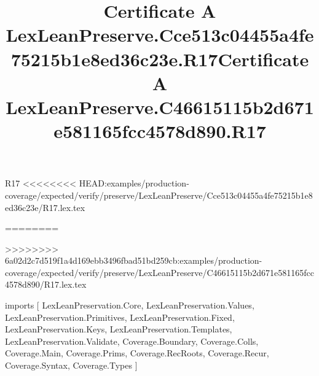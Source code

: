 \begin{lexlean}{R17}
<<<<<<<< HEAD:examples/production-coverage/expected/verify/preserve/LexLeanPreserve/Cce513c04455a4fe75215b1e8ed36c23e/R17.lex.tex
\title{Certificate A LexLeanPreserve.Cce513c04455a4fe75215b1e8ed36c23e.R17}
========
\title{Certificate A LexLeanPreserve.C46615115b2d671e581165fcc4578d890.R17}
>>>>>>>> 6a02d2c7d519f1a4d169ebb3496fbad51bd259cb:examples/production-coverage/expected/verify/preserve/LexLeanPreserve/C46615115b2d671e581165fcc4578d890/R17.lex.tex
\begin{coremodule}
imports [
  LexLeanPreservation.Core,
  LexLeanPreservation.Values,
  LexLeanPreservation.Primitives,
  LexLeanPreservation.Fixed,
  LexLeanPreservation.Keys,
  LexLeanPreservation.Templates,
  LexLeanPreservation.Validate,
  Coverage.Boundary,
  Coverage.Colls,
  Coverage.Main,
  Coverage.Prims,
  Coverage.RecRoots,
  Coverage.Recur,
  Coverage.Syntax,
  Coverage.Types
]


\end{coremodule}
\end{lexlean}
